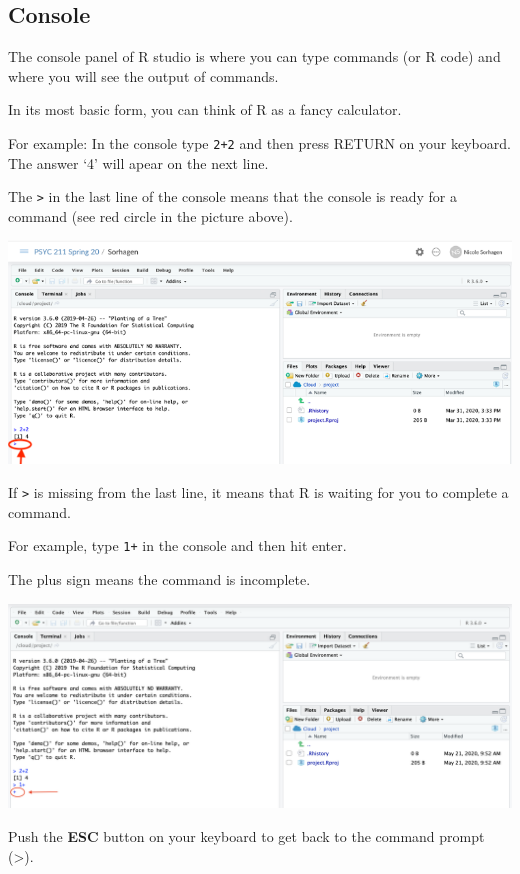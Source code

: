 \documentclass[
]{book}
\begin{document}
\hypertarget{console}{%
\subsection{Console}\label{console}}

The console panel of R studio is where you can type commands (or R code) and where you will see the output of commands.

In its most basic form, you can think of R as a fancy calculator.

For example: In the console type \texttt{2+2} and then press RETURN on your keyboard. The answer `4' will apear on the next line.

The \texttt{\textgreater{}} in the last line of the console means that the console is ready for a command (see red circle in the picture above).

\includegraphics{img/twoplus.png}

If \texttt{\textgreater{}} is missing from the last line, it means that R is waiting for you to complete a command.

For example, type \texttt{1+} in the console and then hit enter.

The plus sign means the command is incomplete.

\includegraphics{img/waiting.png}

Push the \textbf{ESC} button on your keyboard to get back to the command prompt (\textgreater).
\end{document}
